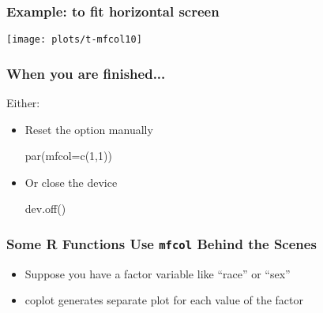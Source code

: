 \documentclass[11pt,english]{beamer}
\begin{document}
\begin{frame}[containsverbatim]
  \frametitle{Example: to fit horizontal screen}



\end{frame}


\begin{frame}[containsverbatim]

\texttt{[image: plots/t-mfcol10]}


\end{frame}

\begin{frame}[containsverbatim]
  \frametitle{When you are finished...}

  Either:
  \begin{itemize}
  \item Reset the option manually

    par(mfcol=c(1,1))

  \item Or close the device

    dev.off()

  \end{itemize}
\end{frame}


\begin{frame}
  \frametitle{Some R Functions Use \texttt{mfcol} Behind the Scenes}
  \begin{itemize}
  \item Suppose you have a factor variable like ``race'' or ``sex''
  \item coplot generates separate plot for each value of the factor


\end{itemize}
\end{frame}
\end{document}
